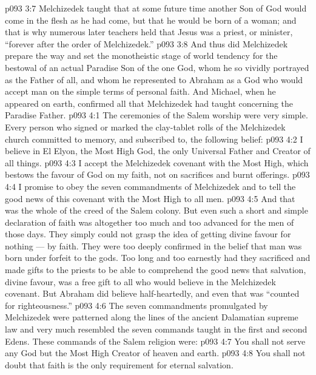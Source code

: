 \vs p093 3:7 Melchizedek taught that at some future time another Son of God would come in the flesh as he had come, but that he would be born of a woman; and that is why numerous later teachers held that Jesus was a priest, or minister, “forever after the order of Melchizedek.”
\vs p093 3:8 And thus did Melchizedek prepare the way and set the monotheistic stage of world tendency for the bestowal of an actual Paradise Son of the one God, whom he so vividly portrayed as the Father of all, and whom he represented to Abraham as a God who would accept man on the simple terms of personal faith. And Michael, when he appeared on earth, confirmed all that Melchizedek had taught concerning the Paradise Father.
\vs p093 4:1 The ceremonies of the Salem worship were very simple. Every person who signed or marked the clay\hyp{}tablet rolls of the Melchizedek church committed to memory, and subscribed to, the following belief:
\vs p093 4:2 \bibnobreakspace I believe in El Elyon, the Most High God, the only Universal Father and Creator of all things.
\vs p093 4:3 \bibnobreakspace I accept the Melchizedek covenant with the Most High, which bestows the favour of God on my faith, not on sacrifices and burnt offerings.
\vs p093 4:4 \bibnobreakspace I promise to obey the seven commandments of Melchizedek and to tell the good news of this covenant with the Most High to all men.
\vs p093 4:5 \pc And that was the whole of the creed of the Salem colony. But even such a short and simple declaration of faith was altogether too much and too advanced for the men of those days. They simply could not grasp the idea of getting divine favour for nothing --- by faith. They were too deeply confirmed in the belief that man was born under forfeit to the gods. Too long and too earnestly had they sacrificed and made gifts to the priests to be able to comprehend the good news that salvation, divine favour, was a free gift to all who would believe in the Melchizedek covenant. But Abraham did believe half\hyp{}heartedly, and even that was “counted for righteousness.”
\vs p093 4:6 \pc The seven commandments promulgated by Melchizedek were patterned along the lines of the ancient Dalamatian supreme law and very much resembled the seven commands taught in the first and second Edens. These commands of the Salem religion were:
\vs p093 4:7 \bibnobreakspace You shall not serve any God but the Most High Creator of heaven and earth.
\vs p093 4:8 \bibnobreakspace You shall not doubt that faith is the only requirement for eternal salvation.
